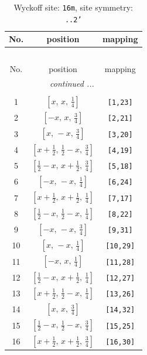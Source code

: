 \documentclass[fleqn,8pt]{jsarticle}
\begin{document}
\renewcommand{\arraystretch}{1.2}
\begin{longtable}{ccc}
\caption{Wyckoff site: {\tt 16m}, site symmetry: {\tt ..2'}}
 \\
 \hline \hline
No. & position & mapping \\ \hline \endfirsthead

\multicolumn{2}{l}{\tablename\ \thetable{}} \\
 \hline \hline
No. & position & mapping \\ \hline \endhead

 \hline \hline
\multicolumn{2}{r}{\footnotesize\it continued ...} \\ \endfoot

 \hline \hline
\multicolumn{2}{r}{} \\ \endlastfoot

1 & $\left[ x,\, x,\, \frac{1}{4} \right]$ & {\tt [1,23]} \\ \hline
2 & $\left[ - x,\, x,\, \frac{3}{4} \right]$ & {\tt [2,21]} \\ \hline
3 & $\left[ x,\, - x,\, \frac{3}{4} \right]$ & {\tt [3,20]} \\ \hline
4 & $\left[ x + \frac{1}{2},\, \frac{1}{2} - x,\, \frac{3}{4} \right]$ & {\tt [4,19]} \\ \hline
5 & $\left[ \frac{1}{2} - x,\, x + \frac{1}{2},\, \frac{3}{4} \right]$ & {\tt [5,18]} \\ \hline
6 & $\left[ - x,\, - x,\, \frac{1}{4} \right]$ & {\tt [6,24]} \\ \hline
7 & $\left[ x + \frac{1}{2},\, x + \frac{1}{2},\, \frac{1}{4} \right]$ & {\tt [7,17]} \\ \hline
8 & $\left[ \frac{1}{2} - x,\, \frac{1}{2} - x,\, \frac{1}{4} \right]$ & {\tt [8,22]} \\ \hline
9 & $\left[ - x,\, - x,\, \frac{3}{4} \right]$ & {\tt [9,31]} \\ \hline
10 & $\left[ x,\, - x,\, \frac{1}{4} \right]$ & {\tt [10,29]} \\ \hline
11 & $\left[ - x,\, x,\, \frac{1}{4} \right]$ & {\tt [11,28]} \\ \hline
12 & $\left[ \frac{1}{2} - x,\, x + \frac{1}{2},\, \frac{1}{4} \right]$ & {\tt [12,27]} \\ \hline
13 & $\left[ x + \frac{1}{2},\, \frac{1}{2} - x,\, \frac{1}{4} \right]$ & {\tt [13,26]} \\ \hline
14 & $\left[ x,\, x,\, \frac{3}{4} \right]$ & {\tt [14,32]} \\ \hline
15 & $\left[ \frac{1}{2} - x,\, \frac{1}{2} - x,\, \frac{3}{4} \right]$ & {\tt [15,25]} \\ \hline
16 & $\left[ x + \frac{1}{2},\, x + \frac{1}{2},\, \frac{3}{4} \right]$ & {\tt [16,30]} \\
\end{longtable}
\end{document}
